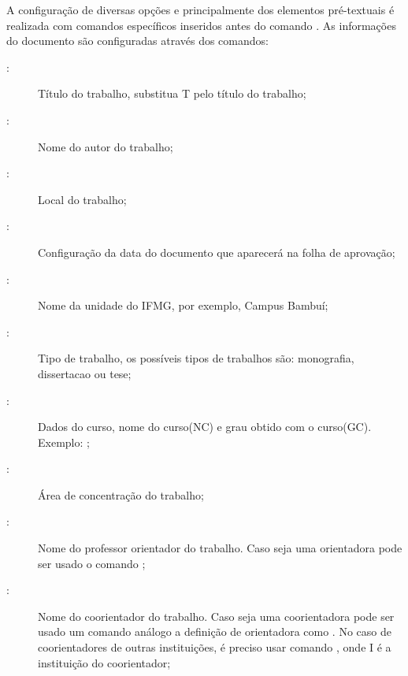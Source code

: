 A configuração de diversas opções e principalmente dos elementos pré-textuais é realizada com comandos específicos inseridos antes do comando . As informações do documento são configuradas através dos comandos:
\begin{description}
\item[:] Título do trabalho, substitua T pelo título do trabalho;
\item[:] Nome do autor do trabalho;
\item[:] Local do trabalho;
\item[:] Configuração da data do documento que aparecerá na folha de aprovação;
\item[:] Nome da unidade do IFMG, por exemplo, Campus Bambuí;
\item[:] Tipo de trabalho, os possíveis tipos de trabalhos são: monografia, dissertacao ou tese;
\item[:] Dados do curso, nome do curso(NC) e grau obtido com o curso(GC).
Exemplo: ;
\item[:] Área de concentração do trabalho;
\item[:] Nome do professor orientador do trabalho.
Caso seja uma orientadora pode ser usado o comando ;
\item[:] Nome do coorientador do trabalho.
Caso seja uma coorientadora pode ser usado um comando análogo a definição de orientadora como .
No caso de coorientadores de outras instituições, é preciso usar  comando , onde I é a instituição do coorientador;

\end{description}
